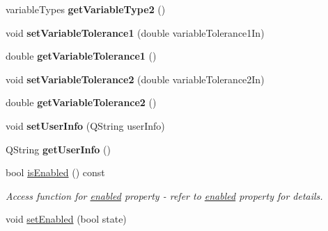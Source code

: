\begin{DoxyCompactItemize}
\item 
\hypertarget{classQEPeriodic_afa23d4be782320f43cc690e3f74b0509}{
variableTypes {\bfseries getVariableType2} ()}
\label{classQEPeriodic_afa23d4be782320f43cc690e3f74b0509}

\item 
\hypertarget{classQEPeriodic_a27837624ec7ed82297547267d9dedb7a}{
void {\bfseries setVariableTolerance1} (double variableTolerance1In)}
\label{classQEPeriodic_a27837624ec7ed82297547267d9dedb7a}

\item 
\hypertarget{classQEPeriodic_a6a1e09657810c9dbf4dfab6a2479ca3b}{
double {\bfseries getVariableTolerance1} ()}
\label{classQEPeriodic_a6a1e09657810c9dbf4dfab6a2479ca3b}

\item 
\hypertarget{classQEPeriodic_a84557554f75972c1d8406f4b15be290b}{
void {\bfseries setVariableTolerance2} (double variableTolerance2In)}
\label{classQEPeriodic_a84557554f75972c1d8406f4b15be290b}

\item 
\hypertarget{classQEPeriodic_a9243d1750fcb0ee5330b531ff604754c}{
double {\bfseries getVariableTolerance2} ()}
\label{classQEPeriodic_a9243d1750fcb0ee5330b531ff604754c}

\item 
\hypertarget{classQEPeriodic_a1328c2e5e4250b559ae7370800df59b1}{
void {\bfseries setUserInfo} (QString userInfo)}
\label{classQEPeriodic_a1328c2e5e4250b559ae7370800df59b1}

\item 
\hypertarget{classQEPeriodic_abf2f98b592f4ad036899e88bf707629e}{
QString {\bfseries getUserInfo} ()}
\label{classQEPeriodic_abf2f98b592f4ad036899e88bf707629e}

\item 
\hypertarget{classQEPeriodic_a9fcb56944d61f82b405035f60f42183b}{
bool \hyperlink{classQEPeriodic_a9fcb56944d61f82b405035f60f42183b}{isEnabled} () const }
\label{classQEPeriodic_a9fcb56944d61f82b405035f60f42183b}

\begin{DoxyCompactList}\small\item\em Access function for \hyperlink{classQEPeriodic_a3eb08b1082d27b46ee418415ed42affb}{enabled} property -\/ refer to \hyperlink{classQEPeriodic_a3eb08b1082d27b46ee418415ed42affb}{enabled} property for details. \end{DoxyCompactList}\item 
\hypertarget{classQEPeriodic_a5a5161c12be2217c2c14b9d8d9195156}{
void \hyperlink{classQEPeriodic_a5a5161c12be2217c2c14b9d8d9195156}{setEnabled} (bool state)}
\label{classQEPeriodic_a5a5161c12be2217c2c14b9d8d9195156}


\end{DoxyCompactItemize}
